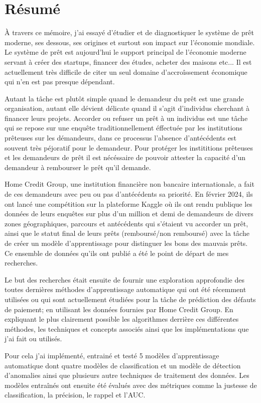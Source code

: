 \section{Résumé}
\label{chapter6.section1}
À travers ce mémoire, j'ai essayé d'étudier et de diagnostiquer le système de prêt moderne, ses dessous, ses origines et surtout son impact sur l'économie mondiale. Le système de prêt est aujourd'hui le support principal de l'économie moderne servant à créer des startups, financer des études, acheter des maisons etc... Il est actuellement très difficile de citer un seul domaine d'accroîssement économique qui n'en est pas presque dépendant. 

Autant la tâche est plutôt simple quand le demandeur du prêt est une grande organisation, autant elle dévient délicate quand il s'agit d'individus cherchant à financer leurs projets. Accorder ou refuser un prêt à un individus est une tâche qui se repose sur une enquête traditionnellement éffectuée par les institutions prêteuses sur les démandeurs, dans ce processus l'absence d'antécédents est souvent très péjoratif pour le demandeur. Pour protéger les instititions prêteuses et les demandeurs de prêt il est nécéssaire de pouvoir attester la capacité d'un demandeur à rembourser le prêt qu'il demande.

Home Credit Group, une institution financière non bancaire internationale, a fait de ces demandeurs avec peu ou pas d'antécédents sa priorité. En février 2024, ils ont lancé une compétition sur la plateforme Kaggle où ils ont rendu publique les données de leurs enquêtes sur plus d'un million et demi de demandeurs de divers zones géographiques, parcours et antécédents qui s'étaient vu accorder un prêt, ainsi que le statut final de leurs prêts (remboursé/non remboursé) avec la tâche de créer un modèle d'apprentissage pour distinguer les bons des mauvais prêts. Ce ensemble de données qu'ils ont publié a été le point de départ de mes recherches.

Le but des recherches était ensuite de fournir une exploration approfondie des toutes dernières méthodes d'apprentissage automatique qui ont été récemment utilisées ou qui sont actuellement étudiées pour la tâche de prédiction des défauts de paiement; en utilisant les données fournies par Home Credit Group. En expliquant le plus clairement possible les algorithmes derrière ces différentes méthodes, les techniques et concepts associés ainsi que les implémentations que j'ai fait ou utilisés.

Pour cela j'ai implémenté, entrainé et testé 5 modèles d'apprentissage automatique dont quatre modèles de classification et un modèle de détection d'anomalies ainsi que plusieurs autre techniques de traitement des données. Les modèles entraînés ont ensuite été évalués avec des métriques comme la justesse de classification, la précision, le rappel et l'AUC.